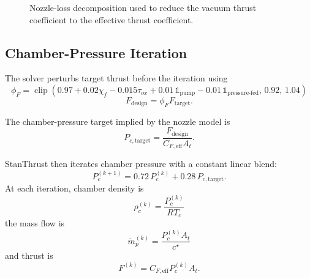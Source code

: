 \documentclass[11pt]{article}
\newcommand{\clip}{\operatorname{clip}}
\newcommand{\mdotp}{\dot{m}_{p}}
\begin{document}
\begin{figure}[H]
\centering
{}
\caption{Nozzle-loss decomposition used to reduce the vacuum thrust coefficient to the effective thrust coefficient.}
\end{figure}

\subsection{Chamber-Pressure Iteration}
The solver perturbs target thrust before the iteration using
\begin{equation}
\phi_F=\clip\!\left(0.97+0.02\chi_f-0.015\tau_{ox}+0.01\,\mathbb{1}_{\text{pump}}-0.01\,\mathbb{1}_{\text{pressure-fed}},\,0.92,\,1.04\right)
\label{eq:thrust-bias}
\end{equation}
\begin{equation}
F_{\text{design}}=\phi_F F_{\text{target}}.
\label{eq:design-thrust}
\end{equation}

The chamber-pressure target implied by the nozzle model is
\begin{equation}
P_{c,\text{target}}=\frac{F_{\text{design}}}{C_{F,\text{eff}}A_t}.
\label{eq:pc-target}
\end{equation}

StanThrust then iterates chamber pressure with a constant linear blend:
\begin{equation}
P_c^{(k+1)}=0.72\,P_c^{(k)}+0.28\,P_{c,\text{target}}.
\label{eq:pc-iter}
\end{equation}
At each iteration, chamber density is
\begin{equation}
\rho_c^{(k)}=\frac{P_c^{(k)}}{RT_c}
\label{eq:rho-chamber}
\end{equation}
the mass flow is
\begin{equation}
\mdotp^{(k)}=\frac{P_c^{(k)}A_t}{c^\star}
\label{eq:mdot-iter}
\end{equation}
and thrust is
\begin{equation}
F^{(k)}=C_{F,\text{eff}}P_c^{(k)}A_t.
\label{eq:thrust-iter}
\end{equation}
\end{document}
